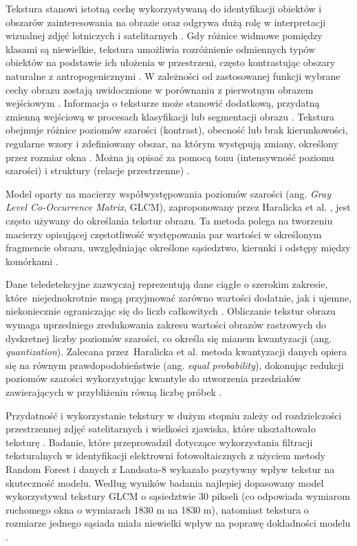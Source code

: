 \documentclass{amuthesis}
\begin{document}
Tekstura stanowi istotną cechę wykorzystywaną do identyfikacji obiektów
i obszarów zainteresowania na obrazie \autocite{haralick_1973_texture}
oraz odgrywa dużą rolę w interpretacji wizualnej zdjęć lotniczych i
satelitarnych \autocite{lewinski_2012_texture}. Gdy różnice widmowe
pomiędzy klasami są niewielkie, tekstura umożliwia rozróżnienie
odmiennych typów obiektów na podstawie ich ułożenia w przestrzeni,
często kontrastując obszary naturalne z antropogenicznymi
\autocite{grass_r_texture}. W zależności od zastosowanej funkcji wybrane
cechy obrazu zostają uwidocznione w porównaniu z pierwotnym obrazem
wejściowym \autocite{lewinski_2012_texture}. Informacja o teksturze może
stanowić dodatkową, przydatną zmienną wejściową w procesach klasyfikacji
lub segmentacji obrazu
\autocite{gong_1992_spatial_features,mumby_2002_ikonos}. Tekstura
obejmuje różnice poziomów szarości (kontrast), obecność lub brak
kierunkowości, regularne wzory i zdefiniowany obszar, na którym
występują zmiany, określony przez rozmiar okna
\autocite{hall_beyer_2017_glcm,grass_r_texture}. Można ją opisać za
pomocą tonu (intensywność poziomu szarości) i struktury (relacje
przestrzenne) \autocite{grass_r_texture}.

Model oparty na macierzy współwystępowania poziomów szarości (ang.
\emph{Gray Level Co-Occurrence Matrix}, GLCM), zaproponowany przez
Haralicka et al. \autocite*{haralick_1973_texture}, jest często używany
do określania tekstur obrazu. Ta metoda polega na tworzeniu macierzy
opisującej częstotliwość występowania par wartości w określonym
fragmencie obrazu, uwzględniając określone sąsiedztwo, kierunki i
odstępy między komórkami \autocite{kupidura_2019_texture}.

Dane teledetekcyjne zazwyczaj reprezentują dane ciągłe o szerokim
zakresie, które~niejednokrotnie mogą przyjmować zarówno wartości
dodatnie, jak i ujemne, niekoniecznie ograniczając się do liczb
całkowitych \autocite{R-GLCMTextures}. Obliczanie tekstur obrazu wymaga
uprzedniego zredukowania zakresu wartości obrazów rastrowych do
dyskretnej liczby poziomów szarości, co określa się mianem kwantyzacji
(ang. \emph{quantization}). Zalecana przez~Haralicka et al.
\autocite*{haralick_1973_texture} metoda kwantyzacji danych opiera się
na równym prawdopodobieństwie (ang. \emph{equal probability}), dokonując
redukcji poziomów szarości wykorzystując kwantyle do utworzenia
przedziałów zawierających w przybliżeniu równą liczbę próbek
\autocite{R-GLCMTextures}.

Przydatność i wykorzystanie tekstury w dużym stopniu zależy od
rozdzielczości przestrzennej zdjęć satelitarnych i wielkości zjawiska,
które ukształtowało teksturę \autocite{grass_r_texture}. Badanie, które
przeprowadził \textcite{zhang_2021_texture} dotyczące wykorzystania
filtracji teksturalnych w identyfikacji elektrowni fotowoltaicznych z
użyciem metody Random Forest i danych z Landsata-8 wykazało pozytywny
wpływ tekstur na skuteczność modelu. Według wyników badania najlepiej
dopasowany model wykorzystywał tekstury GLCM o sąsiedztwie 30 pikseli
(co odpowiada wymiarom ruchomego okna o wymiarach 1830 m na 1830 m),
natomiast tekstura o rozmiarze jednego sąsiada miała niewielki wpływ na
poprawę dokładności modelu \autocite{zhang_2021_texture}.
\end{document}
